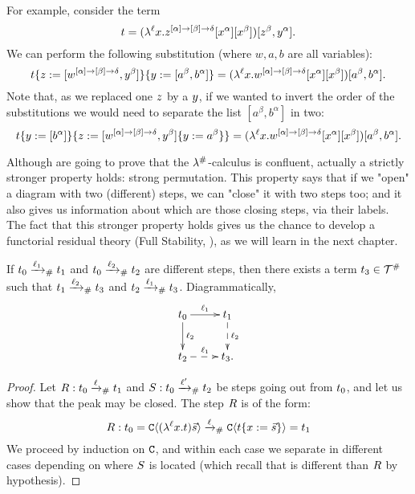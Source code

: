 \begin{example} For example, consider the term
\[
  t =
    (\lambda^{\ell} x. z^{[\alpha] \to [\beta] \to \delta} [x^\alpha] [x^\beta])
      [z^\beta,y^\alpha].
\]
We can perform the following substitution (where $w,a,b$ are all variables):
\[
  \subs{
    \subs{\tm}{\varthree}{[w^{[\alpha] \to [\beta] \to \delta}, \vartwo^\beta]}
  }{
    \vartwo
  }{
    [a^\beta,b^\alpha]
  }
  =
   (\lamp{\lab}{\var}{w^{[\alpha] \to [\beta] \to \delta} [\var^\alpha] [\var^\beta]})
    [a^\beta,b^\alpha].
\]
Note that, as we replaced one $z$ by a $y$, if we wanted to invert the order
of the substitutions we would need to separate the list $[a^\beta, b^\alpha]$ in two:
\[
  \subs{
    \subs{\tm}{\vartwo}{[b^\alpha]}
  }{
    \varthree
  }{
    \subs{[w^{[\alpha] \to [\beta] \to \delta}, \vartwo^\beta]}{\vartwo}{a^\beta}
  }
  =
   (\lamp{\lab}{\var}{w^{[\alpha] \to [\beta] \to \delta} [\var^\alpha] [\var^\beta]})
    [a^\beta,b^\alpha].
\]
\end{example}

\bigskip

Although are going to prove that the $\lambda^{\mathtt{\#}}$-calculus is confluent,
actually a strictly stronger property holds: strong permutation.
This property says that if we "open" a diagram with two (different) steps,
we can "close" it with two steps too; and it also gives us information
about which are those closing steps, via their labels.
The fact that this stronger property holds gives us the chance to
develop a functorial residual theory (\cf Full Stability, ),
as we will learn in the next chapter.



\begin{proposition}
If $t_0 \mathrel{\xrightarrow{\ell_1}_{\mathtt{\#}}} t_1$
and $t_0 \mathrel{\xrightarrow{\ell_2}_{\mathtt{\#}}} t_2$
are different steps, then there exists a term $t_3 \in \mathcal{T}^{\mathtt{\#}}$ such that
$t_1 \mathrel{\xrightarrow{\ell_2}_{\mathtt{\#}}} t_3$ and $t_2 \mathrel{\xrightarrow{\ell_1}_{\mathtt{\#}}} t_3$.
Diagrammatically,
\[
    \xymatrix{
      \tm_0 \ar@{->}[d]^{\lab_2}
            \ar@{->}[r]^{\lab_1} &
      \tm_1 \ar@{-->}[d]^{\lab_2} \\
            \ar@{-->}[r]^{\lab_1}
      \tm_2 &
      \tm_3. \\
    }
\]
\end{proposition}
\begin{proof}
Let $R : t_0 \mathrel{\xrightarrow{\ell}_{\mathtt{\#}}} t_1$ and $S : t_0 \mathrel{\xrightarrow{\ell'}_{\mathtt{\#}}} t_2$
be steps going out from $t_0$, and let us show that the peak may be closed.
The step $R$ is of the form:
\[
  R : t_0 = \mathtt{C}\langle(\lambda^{\ell} x. t)\vec{s}\rangle
           \mathrel{\xrightarrow{\ell}_{\mathtt{\#}}} \mathtt{C}\langle t\{x := \vec{s}\}\rangle = t_1
\]
We proceed by induction on $\mathtt{C}$, and within each case we separate in different
cases depending on where $S$ is located (which recall that is different
than $R$ by hypothesis).
\end{proof}

